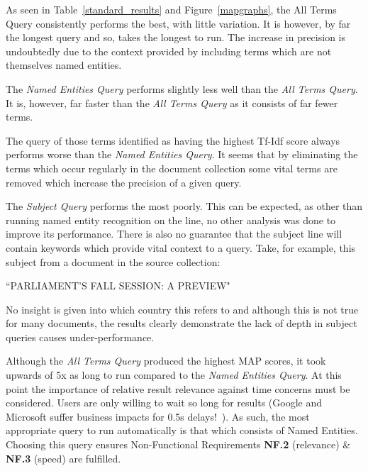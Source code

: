 \documentclass{l4proj}
\begin{document}
As seen in Table~\ref{standard_results} and Figure~\ref{mapgraphs}, the All Terms Query consistently performs the best, with little variation. It is however, by far the longest query and so, takes the longest to run. The increase in precision is undoubtedly due to the context provided by including terms which are not themselves named entities.

The \textit{Named Entities Query} performs slightly less well than the \textit{All Terms Query}. It is, however, far faster than the \textit{All Terms Query} as it consists of far fewer terms.

The query of those terms identified as having the highest Tf-Idf score always performs worse than the \textit{Named Entities Query}. It seems that by eliminating the terms which occur regularly in the document collection some vital terms are removed which increase the precision of a given query.

The \textit{Subject Query} performs the most poorly. This can be expected, as other than running named entity recognition on the line, no other analysis was done to improve its performance. There is also no guarantee that the subject line will contain keywords which provide vital context to a query.
Take, for example, this subject from a document in the source collection:
\begin{center}``PARLIAMENT'S FALL SESSION: A PREVIEW"\end{center}
No insight is given into which country this refers to and although this is not true for many documents, the results clearly demonstrate the lack of depth in subject queries causes under-performance.

Although the \textit{All Terms Query} produced the highest MAP scores, it took upwards of 5x as long to run compared to the \textit{Named Entities Query}. At this point the importance of relative result relevance against time concerns must be considered. Users are only willing to wait so long for results (Google and Microsoft suffer business impacts for 0.5s delays!~\cite{performance}). 
As such, the most appropriate query to run automatically is that which consists of Named Entities. Choosing this query ensures Non-Functional Requirements \textbf{NF.2} (relevance) \& \textbf{NF.3} (speed) are fulfilled.
\end{document}
